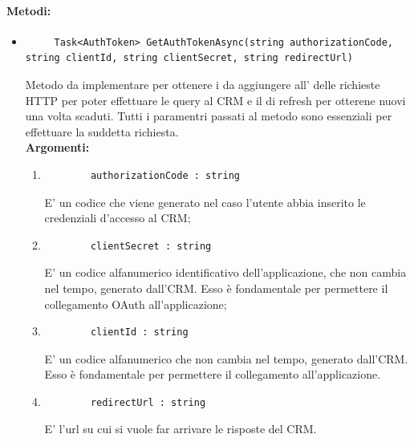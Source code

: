 \paragraph{Metodi:}\hfill
\begin{itemize}
	\itemsep0em 	
	\item 
	\begin{lstlisting}
	 Task<AuthToken> GetAuthTokenAsync(string authorizationCode, string clientId, string clientSecret, string redirectUrl)
	\end{lstlisting}
	Metodo da implementare per ottenere i  da aggiungere all' delle richieste HTTP per poter effettuare le query al CRM e il  di refresh per otterene nuovi  una volta scaduti. Tutti i paramentri passati al metodo sono essenziali per effettuare la suddetta richiesta.\\
	\textbf{\small Argomenti:}
	\begin{enumerate}[leftmargin=*]
		\itemsep0em 
		\item 
		\begin{lstlisting}
		authorizationCode : string
		\end{lstlisting}
		E' un codice che viene generato nel caso l'utente abbia inserito le credenziali d'accesso al CRM;
		\item 
		\begin{lstlisting}
		clientSecret : string
		\end{lstlisting}
		E' un codice alfanumerico identificativo dell'applicazione, che non cambia nel tempo, generato dall'CRM. Esso è fondamentale per permettere il collegamento OAuth all'applicazione; 
		\item 
		\begin{lstlisting}
		clientId : string
		\end{lstlisting}
		E' un codice alfanumerico che non cambia nel tempo, generato dall'CRM. Esso è fondamentale per permettere il collegamento  all'applicazione. 
		\item 
		\begin{lstlisting}
		redirectUrl : string
		\end{lstlisting}
		E' l'url su cui si vuole far arrivare le risposte del CRM.
	\end{enumerate}
	

\end{itemize}
